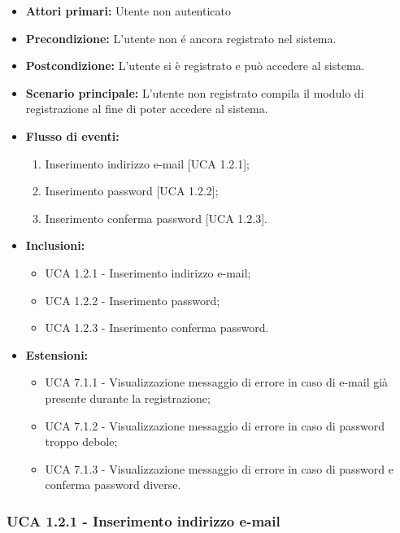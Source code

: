 \begin{itemize}
\item \textbf{Attori primari:} Utente non autenticato
\item \textbf{Precondizione:} L'utente non é ancora registrato nel sistema.
\item \textbf{Postcondizione:} L'utente si è registrato e può accedere al sistema.
\item \textbf{Scenario principale:} L'utente non registrato compila il modulo di registrazione al fine di poter accedere al sistema.%
\item \textbf{Flusso di eventi:} %
  \begin{enumerate}
        \item Inserimento indirizzo e-mail [UCA 1.2.1];
        \item Inserimento password [UCA 1.2.2];
        \item Inserimento conferma password [UCA 1.2.3].
    \end{enumerate}
\item \textbf{Inclusioni:}
	\begin{itemize}
		\item UCA 1.2.1 - Inserimento indirizzo e-mail;
		\item UCA 1.2.2 - Inserimento password;
		\item UCA 1.2.3 - Inserimento conferma password. 
	\end{itemize}
\item \textbf{Estensioni:}
	\begin{itemize}
		\item UCA 7.1.1 - Visualizzazione messaggio di errore in caso di e-mail già presente durante la registrazione;
		\item UCA 7.1.2 - Visualizzazione messaggio di errore in caso di password troppo debole;
		\item UCA 7.1.3 - Visualizzazione messaggio di errore in caso di password e conferma password diverse. 
	\end{itemize}
\end{itemize}

\subsubsection{UCA 1.2.1 - Inserimento indirizzo e-mail}%

